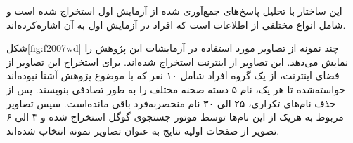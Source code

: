 \begin{enumerate}
این ساختار با تحلیل پاسخ‌های جمع‌آوری شده از آزمایش اول استخراج شده است و شامل انواع مختلفی از اطلاعات است که افراد در آزمایش اول به آن اشاره‌کرده‌اند.





\end{enumerate}


شکل\ref{fig:f2007wd}
چند نمونه از تصاویر مورد استفاده در آزمایشات این پژوهش را نمایش می‌دهد. این تصاویر از اینترنت استخراج شده‌اند. برای استخراج این تصاویر از فضای اینترنت، از یک گروه افراد شامل ۱۰ نفر که با موضوع پژوهش آشنا نبوده‌اند خواسته‌شده تا هر یک، نام ۵ دسته صحنه مختلف را به طور تصادفی بنویسند. پس از حذف نام‌های تکراری، ۲۵ الی ۳۰ نام منحصربه‌فرد باقی مانده‌است. سپس تصاویر مربوط به هریک از این نام‌ها توسط موتور جستجوی گوگل استخراج شده و ۳ الی ۶ تصویر از صفحات اولیه نتایج به عنوان تصاویر نمونه انتخاب شده‌اند.

